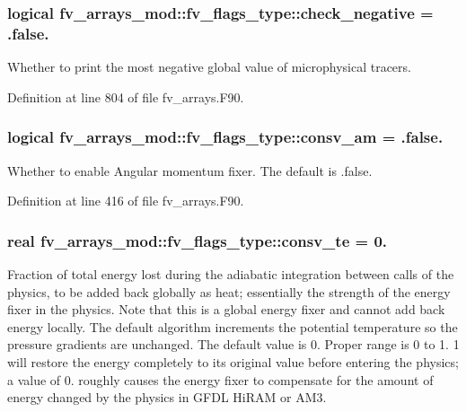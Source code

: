 \subsubsection[{check\-\_\-negative}]{\setlength{\rightskip}{0pt plus 5cm}logical fv\-\_\-arrays\-\_\-mod\-::fv\-\_\-flags\-\_\-type\-::check\-\_\-negative = .false.}\label{structfv__arrays__mod_1_1fv__flags__type_a6fa5be2c75d0c6fd4c3d79f36bc3d87a}


Whether to print the most negative global value of microphysical tracers. 



Definition at line 804 of file fv\-\_\-arrays.\-F90.

\subsubsection[{consv\-\_\-am}]{\setlength{\rightskip}{0pt plus 5cm}logical fv\-\_\-arrays\-\_\-mod\-::fv\-\_\-flags\-\_\-type\-::consv\-\_\-am = .false.}\label{structfv__arrays__mod_1_1fv__flags__type_abcebc94566be36845e4285c6a024751d}


Whether to enable Angular momentum fixer. The default is .false. 



Definition at line 416 of file fv\-\_\-arrays.\-F90.

\subsubsection[{consv\-\_\-te}]{\setlength{\rightskip}{0pt plus 5cm}real fv\-\_\-arrays\-\_\-mod\-::fv\-\_\-flags\-\_\-type\-::consv\-\_\-te = 0.}\label{structfv__arrays__mod_1_1fv__flags__type_a0636d8677b28dfabffa981e838f08ebc}


Fraction of total energy lost during the adiabatic integration between calls of the physics, to be added back globally as heat; essentially the strength of the energy fixer in the physics. Note that this is a global energy fixer and cannot add back energy locally. The default algorithm increments the potential temperature so the pressure gradients are unchanged. The default value is 0. Proper range is 0 to 1. 1 will restore the energy completely to its original value before entering the physics; a value of 0. roughly causes the energy fixer to compensate for the amount of energy changed by the physics in G\-F\-D\-L Hi\-R\-A\-M or A\-M3. 




